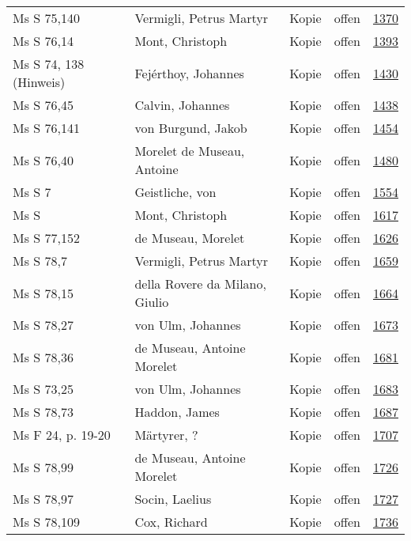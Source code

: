 \documentclass[10pt,a4paper,landscape]{report}
\begin{document}
\begin{longtable}{p{16cm}p{4cm}llr}
Ms S 75,140	&	Vermigli, Petrus Martyr	&	Kopie	&	offen	&	\href{http://130.60.24.72/assignment/1370}{1370}\\
Ms S 76,14	&	Mont, Christoph	&	Kopie	&	offen	&	\href{http://130.60.24.72/assignment/1393}{1393}\\
Ms S 74, 138 (Hinweis)	&	Fejérthoy, Johannes	&	Kopie	&	offen	&	\href{http://130.60.24.72/assignment/1430}{1430}\\
Ms S 76,45	&	Calvin, Johannes	&	Kopie	&	offen	&	\href{http://130.60.24.72/assignment/1438}{1438}\\
Ms S 76,141	&	von Burgund, Jakob	&	Kopie	&	offen	&	\href{http://130.60.24.72/assignment/1454}{1454}\\
Ms S 76,40	&	Morelet de Museau, Antoine	&	Kopie	&	offen	&	\href{http://130.60.24.72/assignment/1480}{1480}\\
Ms S 7	&	Geistliche, von	&	Kopie	&	offen	&	\href{http://130.60.24.72/assignment/1554}{1554}\\
Ms S	&	Mont, Christoph	&	Kopie	&	offen	&	\href{http://130.60.24.72/assignment/1617}{1617}\\
Ms S 77,152	&	de Museau, Morelet	&	Kopie	&	offen	&	\href{http://130.60.24.72/assignment/1626}{1626}\\
Ms S 78,7	&	Vermigli, Petrus Martyr	&	Kopie	&	offen	&	\href{http://130.60.24.72/assignment/1659}{1659}\\
Ms S 78,15	&	della Rovere da Milano, Giulio	&	Kopie	&	offen	&	\href{http://130.60.24.72/assignment/1664}{1664}\\
Ms S 78,27	&	von Ulm, Johannes	&	Kopie	&	offen	&	\href{http://130.60.24.72/assignment/1673}{1673}\\
Ms S 78,36	&	de Museau, Antoine Morelet	&	Kopie	&	offen	&	\href{http://130.60.24.72/assignment/1681}{1681}\\
Ms S 73,25	&	von Ulm, Johannes	&	Kopie	&	offen	&	\href{http://130.60.24.72/assignment/1683}{1683}\\
Ms S 78,73	&	Haddon, James	&	Kopie	&	offen	&	\href{http://130.60.24.72/assignment/1687}{1687}\\
Ms F 24, p. 19-20	&	Märtyrer, ?	&	Kopie	&	offen	&	\href{http://130.60.24.72/assignment/1707}{1707}\\
Ms S 78,99	&	de Museau, Antoine Morelet	&	Kopie	&	offen	&	\href{http://130.60.24.72/assignment/1726}{1726}\\
Ms S 78,97	&	Socin, Laelius	&	Kopie	&	offen	&	\href{http://130.60.24.72/assignment/1727}{1727}\\
Ms S 78,109	&	Cox, Richard	&	Kopie	&	offen	&	\href{http://130.60.24.72/assignment/1736}{1736}\\

\end{longtable}
\end{document}
